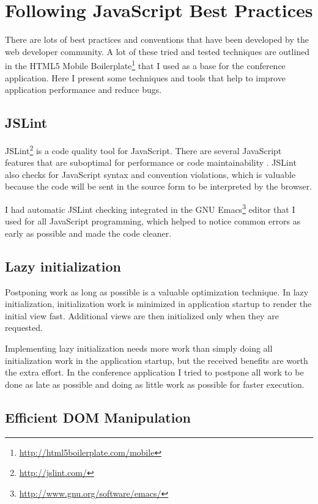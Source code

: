 \section{Following JavaScript Best Practices}
\label{section:js-best-practices}

There are lots of best practices and conventions that have been
developed by the web developer community. A lot of these tried and
tested techniques are outlined in the HTML5 Mobile
Boilerplate\footnote{\url{http://html5boilerplate.com/mobile}} that I
used as a base for the conference application. Here I present some
techniques and tools that help to improve application performance and
reduce bugs.

\subsection{JSLint}

JSLint\footnote{\url{http://jslint.com/}} is a code quality tool for
JavaScript. There are several JavaScript features that are suboptimal
for performance or code maintainability
\cite{crockford2008javascript}. JSLint also checks for JavaScript
syntax and convention violations, which is valuable because the code
will be sent in the source form to be interpreted by the browser.

I had automatic JSLint checking integrated in the GNU
Emacs\footnote{\url{http://www.gnu.org/software/emacs/}} editor that I
used for all JavaScript programming, which helped to notice common
errors as early as possible and made the code cleaner.

\subsection{Lazy initialization}

Postponing work as long as possible is a valuable optimization
technique. In lazy initialization, initialization work is minimized in
application startup to render the initial view fast. Additional views
are then initialized only when they are requested.

Implementing lazy initialization needs more work than simply doing all
initialization work in the application startup, but the received
benefits are worth the extra effort. In the conference application I
tried to postpone all work to be done as late as possible and doing as
little work as possible for faster execution.

\subsection{Efficient DOM Manipulation}

